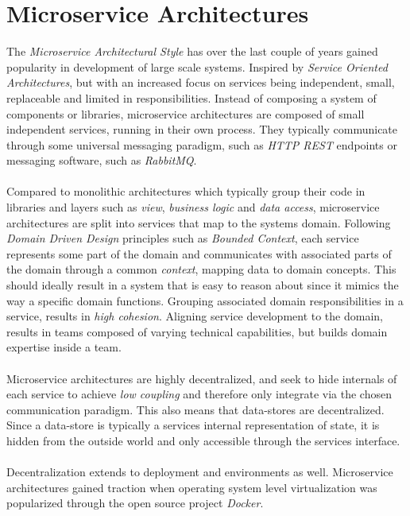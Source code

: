 \section{Microservice Architectures}
The \textit{Microservice Architectural Style} has over the last couple of years
gained popularity in development of large scale systems. Inspired by
\textit{Service Oriented Architectures}, but with an increased focus on
services being independent, small, replaceable and limited in responsibilities.
Instead of composing a system of components or libraries, microservice
architectures are composed of small independent services, running in their own
process. They typically communicate through some universal messaging paradigm,
such as \textit{HTTP REST} endpoints or messaging software, such as
\textit{RabbitMQ}.
\\\\
Compared to monolithic architectures which typically group their code in
libraries and layers such as \textit{view}, \textit{business logic} and
\textit{data access}, microservice architectures are split into services that
map to the systems domain. Following \textit{Domain Driven Design} principles
such as \textit{Bounded Context}, each service represents some part of the
domain and communicates with associated parts of the domain through a common
\textit{context}, mapping data to domain concepts. This should ideally result
in a system that is easy to reason about since it mimics the way a specific
domain functions. Grouping associated domain responsibilities in a service,
results in \textit{high cohesion}.
Aligning service development to the domain, results in teams composed of
varying technical capabilities, but builds domain expertise inside a team.
\\\\
Microservice architectures are highly decentralized, and seek to hide internals
of each service to achieve \textit{low coupling} and therefore only integrate
via the chosen communication paradigm. This also means that data-stores are
decentralized. Since a data-store is typically a services internal representation
of state, it is hidden from the outside world and only accessible through the
services interface.
\\\\
Decentralization extends to deployment and environments as well. Microservice
architectures gained traction when operating system level virtualization was
popularized through the open source project \textit{Docker}.
